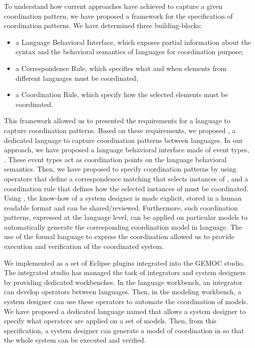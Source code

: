 To understand how current approaches have achieved to capture a given coordination pattern, we have proposed a framework for the specification of coordination patterns. We have determined three building-blocks: 


	\begin{itemize}
	\item a Language Behavioral Interface, which exposes partial information about the syntax and the behavioral semantics of languages for coordination purpose; 
	
	\item a Correspondence Rule, which specifies what and when elements from different languages must be coordinated;
	
	\item a Coordination Rule, which specify how the selected elements must be coordinated. 
\end{itemize}

This framework allowed us to presented the requirements for a language to capture coordination patterns. Based on these requirements, we proposed \bcool, a dedicated language to capture coordination patterns between languages. In our approach, we have proposed a language behavioral interface made of event types, \ie \dse. These event types act as coordination points on the language behavioral semantics. Then, we have proposed to specify coordination patterns by using operators that define a correspondence matching that selects instances of \dse, and a coordination rule that defines how the selected instances of \dse must be coordinated. Using \bcool, the know-how of a system designer is made explicit, stored in a human readable format and can be shared/reviewed. Furthermore, such coordination patterns, expressed at the language level, can be applied on particular models to automatically generate the corresponding coordination model in \ccsl language. The use of the formal \ccsl language to express the coordination allowed us to provide execution and verification of the coordinated system.
	
We implemented \bcool as a set of Eclipse plugins integrated into the GEMOC studio. {\color{red}The integrated studio has managed the task of integrators and system designers by providing dedicated workbenches}. In the language workbench, an integrator can develop operators between languages. Then, in the modeling workbench, a system designer can use these operators to automate the coordination of models. We have proposed a dedicated language named \bflow that allows a system designer to specify what operators are applied on a set of models. Then, from this specification, a system designer can generate a model of coordination in \ccsl so that the whole system can be executed and verified.  
	

